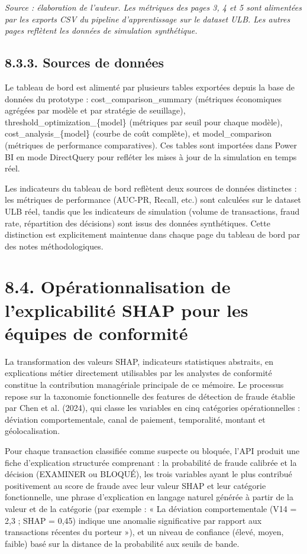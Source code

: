 \emph{Source : élaboration de l'auteur. Les métriques des pages 3, 4 et 5 sont alimentées par les exports CSV du pipeline d'apprentissage sur le }\emph{dataset}\emph{ ULB. Les autres pages reflètent les données de simulation synthétique.}

\subsection{8.3.3. Sources de données}

Le tableau de bord est alimenté par plusieurs tables exportées depuis la base de données du prototype : cost\_comparison\_summary (métriques économiques agrégées par modèle et par stratégie de seuillage), threshold\_optimization\_\{model\} (métriques par seuil pour chaque modèle), cost\_analysis\_\{model\} (courbe de coût complète), et model\_comparison (métriques de performance comparatives). Ces tables sont importées dans Power BI en mode DirectQuery pour refléter les mises à jour de la simulation en temps réel.

Les indicateurs du tableau de bord reflètent deux sources de données distinctes : les métriques de performance (AUC-PR, Recall, etc.) sont calculées sur le dataset ULB réel, tandis que les indicateurs de simulation (volume de transactions, fraud rate, répartition des décisions) sont issus des données synthétiques. Cette distinction est explicitement maintenue dans chaque page du tableau de bord par des notes méthodologiques.

\section{8.4. Opérationnalisation de l'explicabilité SHAP pour les équipes de conformité}

La transformation des valeurs SHAP, indicateurs statistiques abstraits, en explications métier directement utilisables par les analystes de conformité constitue la contribution managériale principale de ce mémoire. Le processus repose sur la taxonomie fonctionnelle des features de détection de fraude établie par Chen et al. (2024), qui classe les variables en cinq catégories opérationnelles : déviation comportementale, canal de paiement, temporalité, montant et géolocalisation.

Pour chaque transaction classifiée comme suspecte ou bloquée, l'API produit une fiche d'explication structurée comprenant : la probabilité de fraude calibrée et la décision (EXAMINER ou BLOQUÉ), les trois variables ayant le plus contribué positivement au score de fraude avec leur valeur SHAP et leur catégorie fonctionnelle, une phrase d'explication en langage naturel générée à partir de la valeur et de la catégorie (par exemple : « La déviation comportementale (V14 = 2,3 ; SHAP = 0,45) indique une anomalie significative par rapport aux transactions récentes du porteur »), et un niveau de confiance (élevé, moyen, faible) basé sur la distance de la probabilité aux seuils de bande.

